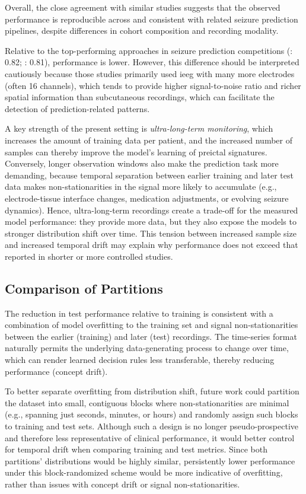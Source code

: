 Overall, the close agreement with similar studies suggests that the observed performance is reproducible across and consistent with related seizure prediction pipelines, despite differences in cohort composition and recording modality.

Relative to the top-performing approaches in seizure prediction competitions (\textcite{brinkmann_crowdsourcing_2016}: \num{0.82}; \textcite{kuhlmann_seizure_2018}: \num{0.81}), performance is lower.
However, this difference should be interpreted cautiously because those studies primarily used \gls{ieeg} with many more electrodes (often 16 channels), which tends to provide higher signal-to-noise ratio and richer spatial information than subcutaneous recordings, which can facilitate the detection of prediction-related patterns.

A key strength of the present setting is \textit{ultra-long-term monitoring}, which increases the amount of training data per patient, and the increased number of samples can thereby improve the model's learning of preictal signatures.
Conversely, longer observation windows also make the prediction task more demanding, because temporal separation between earlier training and later test data makes non-stationarities in the signal more likely to accumulate (e.g., electrode-tissue interface changes, medication adjustments, or evolving seizure dynamics).
Hence, ultra-long-term recordings create a trade-off for the measured model performance: they provide more data, but they also expose the models to stronger distribution shift over time.
This tension between increased sample size and increased temporal drift may explain why performance does not exceed that reported in shorter or more controlled studies.

\subsection{Comparison of Partitions}
The reduction in test performance relative to training is consistent with a combination of model overfitting to the training set and signal non-stationarities between the earlier (training) and later (test) recordings.
The time-series format naturally permits the underlying data-generating process to change over time, which can render learned decision rules less transferable, thereby reducing performance (concept drift).

To better separate overfitting from distribution shift, future work could partition the dataset into small, contiguous blocks where non-stationarities are minimal (e.g., spanning just seconds, minutes, or hours) and randomly assign such blocks to training and test sets.
Although such a design is no longer pseudo-prospective and therefore less representative of clinical performance, it would better control for temporal drift when comparing training and test metrics.
Since both partitions' distributions would be highly similar, persistently lower performance under this block-randomized scheme would be more indicative of overfitting, rather than issues with concept drift or signal non-stationarities.

